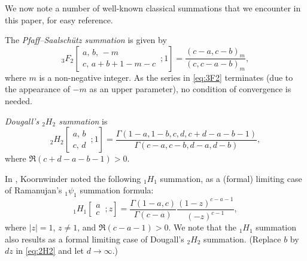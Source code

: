 \documentclass[reqno,12pt]{amsart}
\theoremstyle{remark}
\numberwithin{equation}{section}
\newcommand{\Ga}{\Gamma}
\begin{document}
We now note a number of well-known classical summations
that we encounter in this paper, for easy reference.

The \textit{Pfaff--Saalsch\"utz summation} \cite[Equation~(2.3.1.3)]{Sl}
is given by
\begin{equation}\label{eq:3F2}
{}_3F_2\!\left[\begin{matrix}a,\,b,\,-m\\
c,\,a+b+1-m-c\end{matrix}\,;1\right]=\frac{(c-a,c-b)_m}{(c,c-a-b)_m},
\end{equation}
where $m$ is a non-negative integer.
As the series in \eqref{eq:3F2} terminates (due to the appearance
of $-m$ as an upper parameter),
no condition of convergence is needed.

\textit{Dougall's ${}_2H_2$ summation} \cite[Equation~(6.1.2.1)]{Sl} is
\begin{equation}\label{eq:2H2}
{}_2H_2\!\left[\begin{matrix}a,\,b\\
c,\, d\end{matrix}\,;1\right]=\frac{\Ga(1-a,1-b,c,d,c+d-a-b-1)}
{\Ga(c-a,c-b,d-a,d-b)},
\end{equation}
where $\Re(c+d-a-b-1)>0$.

In \cite[Section~1.6]{K}, Koornwinder noted the following ${}_1H_1$ summation,
as a (formal) limiting case of Ramanujan's $_1\psi_1$ summation formula:
\begin{equation}\label{eq:1H1}
{}_1H_1\!\left[\begin{matrix}a\\
c\end{matrix}\,;z\right]=\frac{\Ga(1-a,c)}
{\Ga(c-a)}\frac{(1-z)^{c-a-1}}{(-z)^{c-1}},
\end{equation}
where $|z|=1$, $z\ne 1$, and $\Re(c-a-1)>0$.
We note that the ${}_1H_1$ summation also results as a formal limiting case
of Dougall's ${}_2H_2$ summation. (Replace $b$ by $dz$
in \eqref{eq:2H2} and let $d\to\infty$.)
\end{document}
